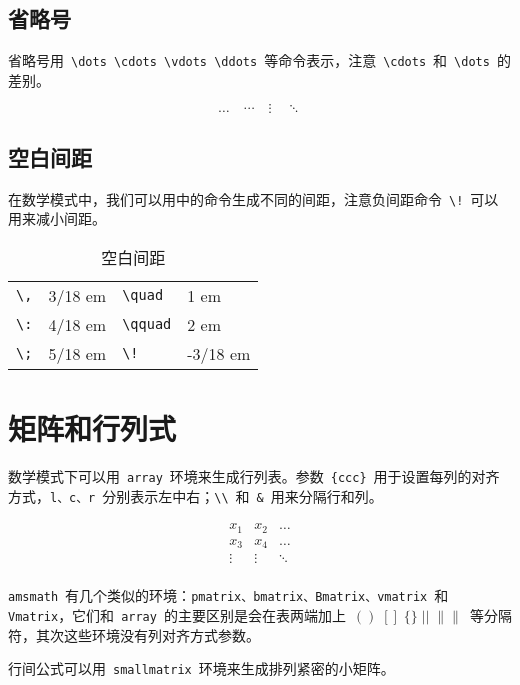 \subsection{省略号}
省略号用~\verb|\dots \cdots \vdots \ddots|~等命令表示，注意~\verb|\cdots|~和~\verb|\dots|~的差别。
\begin{out}
\[\dots\quad \cdots\quad \vdots\quad \ddots\]
\end{out}

\subsection{空白间距}
在数学模式中，我们可以用中的命令生成不同的间距，注意负间距命令~\verb|\!|~可以用来减小间距。

\begin{table}[htbp]
\caption{空白间距}
\label{tab:quad}
\centering
\begin{tabular}{llll}
    \toprule
    \verb|\,| & 3/18 em & \verb|\quad|  & 1 em \\    
    \verb|\:| & 4/18 em & \verb|\qquad| & 2 em \\    
    \verb|\;| & 5/18 em & \verb|\!|     & -3/18 em \\
    \bottomrule
\end{tabular}
\end{table}

\section{矩阵和行列式}
数学模式下可以用~\verb|array|~环境来生成行列表。参数~\verb|{ccc}|~用于设置每列的对齐方式，\verb|l、c、r|~分别表示左中右；\verb|\\|~和~\verb|&|~用来分隔行和列。

\begin{demo}
\[\begin{array}{ccc}
x_1 & x_2 & \dots \\
x_3 & x_4 & \dots \\
\vdots & \vdots & \ddots \\
\end{array}\]
\end{demo}

\verb|amsmath|~有几个类似的环境：\verb|pmatrix、bmatrix、Bmatrix、vmatrix|~和~
\verb|Vmatrix|，它们和~\verb|array|~的主要区别是会在表两端加上~$()\; []\; \{\}\; ||\; \|\|$~等分隔符，其次这些环境没有列对齐方式参数。

行间公式可以用~\verb|smallmatrix|~环境来生成排列紧密的小矩阵。

